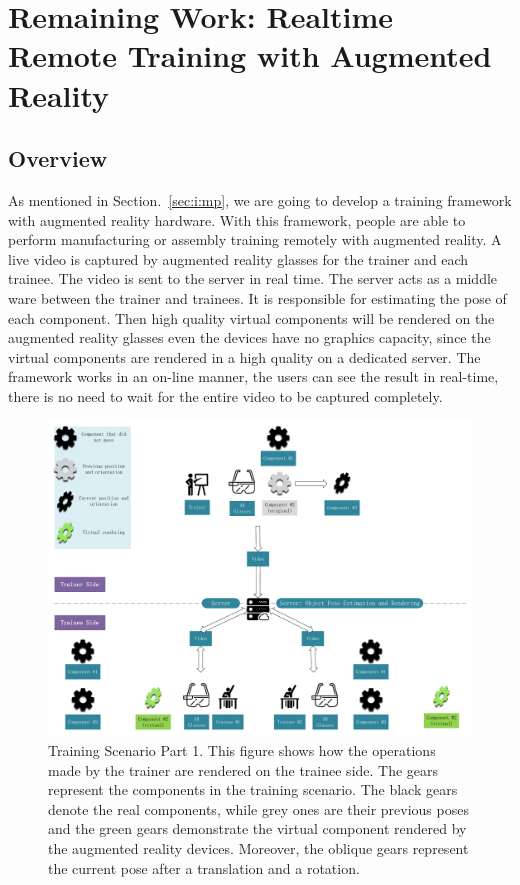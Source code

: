 \chapter{Remaining Work: Realtime Remote Training with Augmented Reality}
\label{chap:rrtar}

\section{Overview}

As mentioned in Section.~\ref{sec:i:mp}, we are going to develop a training framework with augmented reality hardware. With this framework, people are able to perform manufacturing or assembly training remotely with augmented reality.
A live video is captured by augmented reality glasses for the trainer and each trainee. The video is sent to the server in real time. The server acts as a middle ware between the trainer and trainees. It is responsible for estimating the pose of each component.
Then high quality virtual components will be rendered on the augmented reality glasses even the devices have no graphics capacity, since the virtual components are rendered in a high quality on a dedicated server. The framework works in an on-line manner, the users can see the result in real-time, there is no need to wait for the entire video to be captured completely.

\begin{figure}
	\centering
	\includegraphics[width=\textwidth]{figures/scenario1.pdf}
	\caption{Training Scenario Part 1. This figure shows how the operations made by the trainer are rendered on the trainee side. The gears represent the components in the training scenario. The black gears denote the real components, while grey ones are their previous poses and the green gears demonstrate the virtual component rendered by the augmented reality devices. Moreover, the oblique gears represent the current pose after a translation and a rotation.}
	\label{fig-scenario1}
\end{figure}

